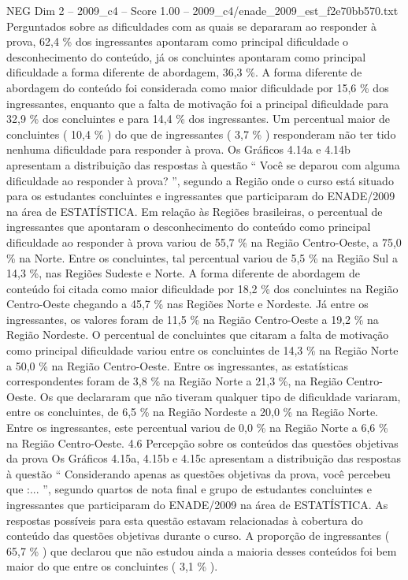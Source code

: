 \begin{textsample}{NEG Dim 2 – 2009\_c4 – Score 1.00 – 2009\_c4/enade\_2009\_est\_f2e70bb570.txt}
Perguntados sobre as dificuldades com as quais se depararam ao responder à prova, 62,4 \% dos ingressantes apontaram como principal dificuldade o desconhecimento do conteúdo, já os concluintes apontaram como principal dificuldade a forma diferente de abordagem, 36,3 \%.
A forma diferente de abordagem do conteúdo foi considerada como maior dificuldade por 15,6 \% dos ingressantes, enquanto que a falta de motivação foi a principal dificuldade para 32,9 \% dos concluintes e para 14,4 \% dos ingressantes.
Um percentual maior de concluintes ( 10,4 \% ) do que de ingressantes ( 3,7 \% ) responderam não ter tido nenhuma dificuldade para responder à prova.
Os Gráficos 4.14a e 4.14b apresentam a distribuição das respostas à questão “ Você se deparou com alguma dificuldade ao responder à prova? ”, segundo a Região onde o curso está situado para os estudantes concluintes e ingressantes que participaram do ENADE/2009 na área de ESTATÍSTICA.
Em relação às Regiões brasileiras, o percentual de ingressantes que apontaram o desconhecimento do conteúdo como principal dificuldade ao responder à prova variou de 55,7 \% na Região Centro-Oeste, a 75,0 \% na Norte.
Entre os concluintes, tal percentual variou de 5,5 \% na Região Sul a 14,3 \%, nas Regiões Sudeste e Norte.
A forma diferente de abordagem de conteúdo foi citada como maior dificuldade por 18,2 \% dos concluintes na Região Centro-Oeste chegando a 45,7 \% nas Regiões Norte e Nordeste.
Já entre os ingressantes, os valores foram de 11,5 \% na Região Centro-Oeste a 19,2 \% na Região Nordeste.
O percentual de concluintes que citaram a falta de motivação como principal dificuldade variou entre os concluintes de 14,3 \% na Região Norte a 50,0 \% na Região Centro-Oeste.
Entre os ingressantes, as estatísticas correspondentes foram de 3,8 \% na Região Norte a 21,3 \%, na Região Centro-Oeste.
Os que declararam que não tiveram qualquer tipo de dificuldade variaram, entre os concluintes, de 6,5 \% na Região Nordeste a 20,0 \% na Região Norte.
Entre os ingressantes, este percentual variou de 0,0 \% na Região Norte a 6,6 \% na Região Centro-Oeste. 4.6 Percepção sobre os conteúdos das questões objetivas da prova Os Gráficos 4.15a, 4.15b e 4.15c apresentam a distribuição das respostas à questão “ Considerando apenas as questões objetivas da prova, você percebeu que :... ”, segundo quartos de nota final e grupo de estudantes concluintes e ingressantes que participaram do ENADE/2009 na área de ESTATÍSTICA.
As respostas possíveis para esta questão estavam relacionadas à cobertura do conteúdo das questões objetivas durante o curso.
A proporção de ingressantes ( 65,7 \% ) que declarou que não estudou ainda a maioria desses conteúdos foi bem maior do que entre os concluintes ( 3,1 \% ).

\end{textsample}

